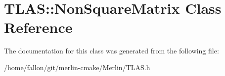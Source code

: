 \hypertarget{classTLAS_1_1NonSquareMatrix}{}\section{T\+L\+AS\+:\+:Non\+Square\+Matrix Class Reference}
\label{classTLAS_1_1NonSquareMatrix}


The documentation for this class was generated from the following file\+:\begin{DoxyCompactItemize}
\item 
/home/fallon/git/merlin-\/cmake/\+Merlin/T\+L\+A\+S.\+h\end{DoxyCompactItemize}
